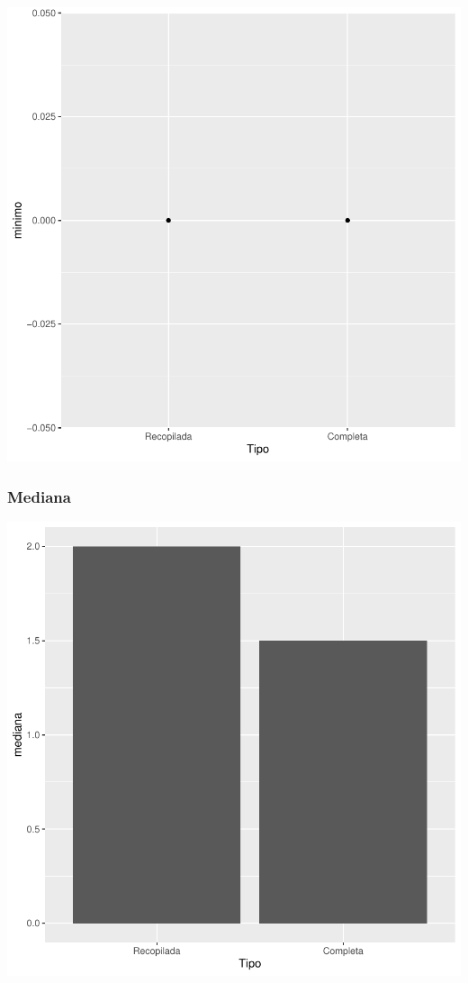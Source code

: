 \documentclass{article}
\begin{document}
\includegraphics{seguimento2-068}

\subsubsection{Mediana}

\includegraphics{seguimento2-069}
\end{document}

